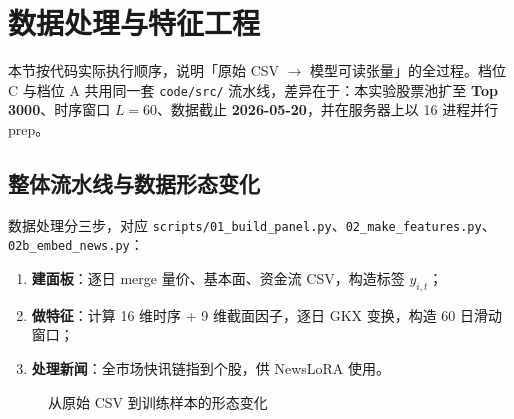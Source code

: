 \documentclass[UTF8,a4paper,12pt]{ctexart}
\begin{document}
\section{数据处理与特征工程}

本节按代码实际执行顺序，说明「原始 CSV $\to$ 模型可读张量」的全过程。档位 C 与档位 A 共用同一套 \texttt{code/src/} 流水线，差异在于：本实验股票池扩至 \textbf{Top 3000}、时序窗口 \textbf{$L=60$}、数据截止 \textbf{2026-05-20}，并在服务器上以 16 进程并行 prep。

\subsection{整体流水线与数据形态变化}

数据处理分三步，对应 \texttt{scripts/01\_build\_panel.py}、\texttt{02\_make\_features.py}、\texttt{02b\_embed\_news.py}：

\begin{enumerate}[leftmargin=2em]
  \item \textbf{建面板}：逐日 merge 量价、基本面、资金流 CSV，构造标签 $y_{i,t}$；
  \item \textbf{做特征}：计算 16 维时序 + 9 维截面因子，逐日 GKX 变换，构造 60 日滑动窗口；
  \item \textbf{处理新闻}：全市场快讯链指到个股，供 NewsLoRA 使用。
\end{enumerate}

\begin{figure}[H]
\centering
{}
\caption{从原始 CSV 到训练样本的形态变化}
\label{fig:data-pipeline}
\end{figure}
\end{document}
